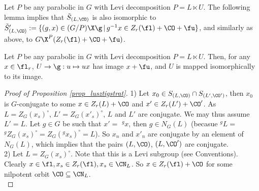 Let $P$ be any parabolic in $G$ with Levi decomposition $P=L\ltimes U$. The following lemma implies that $\Tilde{S}_{(L,\CO)}$ is also isomorphic to $\Tilde{S}'_{(L,\CO)}:=\{(g,x)\in (G/P)\X \g\,|\, g^{-1}x\in Z_r(\fl)+\CO+\fu\}$, and similarly as above, to $G\X^P(Z_r(\fl)+\CO+\fu)$.

\begin{lemma}\label{lem_U_action_on_l_r}
    Let $P$ be any parabolic in $G$ with Levi decomposition $P=L\ltimes U$. Then, for any $x\in\fl_r$, $U\rightarrow \g: u\mapsto ux$ has image $x+\fu$, and $U$ is mapped isomorphically to its image. 
\end{lemma}

\begin{proof}[Proof of Proposition \ref{prop_lusztigstrat}]
    1) Let $x_0\in S_{(L,\CO)}\cap S_{(L',\CO')}$, then $x_0$ is $G$-conjugate to some $x\in Z_r(L)+\CO$ and $x'\in Z_r(L')+\CO'$. As $L=Z_G(x_s)^\circ$, $L'=Z_G(x'_s)^\circ$, $L$ and $L'$ are conjugate. We may thus assume $L'=L$. Let $g\in G$ be such that $x'=$ $^gx$, then $g\in N_G(L)$ (becasue $^gL=$ $^gZ_G(x_s)^\circ=Z_G(^gx_s)^\circ=L$). So $x_n$ and $x'_n$ are conjugate by an element of $N_G(L)$, which implies that the pairs $(L,\CO)$, $(L,\CO')$ are conjugate.\\

    2) Let $L=Z_G(x_s)^\circ$. Note that this is a Levi subgroup (see Conventions). Clearly $x\in\fl, x_s\in Z_r(\fl), x_s\in \CN_L$. So $x\in Z_r(\fl)+\CO$ for some nilpotent orbit $\CO\subseteq \CN_L$.\\


\end{proof}
